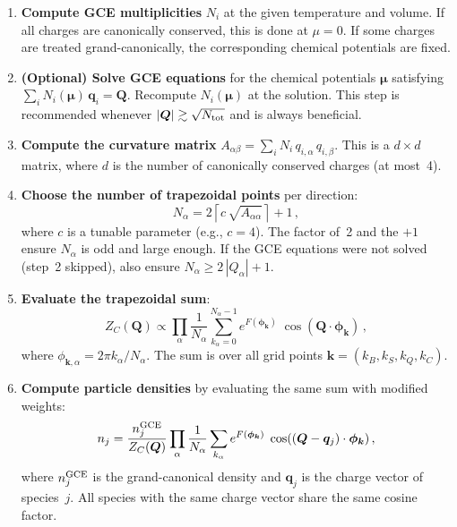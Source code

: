 \documentclass[11pt,a4paper]{article}
\newcommand{\bphi}{\bm{\phi}}
\newcommand{\bq}{\bm{q}}
\newcommand{\bQ}{\bm{Q}}
\begin{document}
\begin{enumerate}
  \item \textbf{Compute GCE multiplicities} $N_i$ at the given temperature and volume.
  If all charges are canonically conserved, this is done at $\mu = 0$.
  If some charges are treated grand-canonically, the corresponding chemical potentials are fixed.

  \item \textbf{(Optional) Solve GCE equations} for the chemical potentials $\bm{\mu}$ satisfying $\sum_i N_i(\bm{\mu})\,\bq_i = \bQ$.
  Recompute $N_i(\bm{\mu})$ at the solution.
  This step is recommended whenever $|\bQ| \gtrsim \sqrt{N_{\rm tot}}$ and is always beneficial.

  \item \textbf{Compute the curvature matrix} $A_{\alpha\beta} = \sum_i N_i\,q_{i,\alpha}\,q_{i,\beta}$.
  This is a $d \times d$ matrix, where $d$ is the number of canonically conserved charges (at most~4).

  \item \textbf{Choose the number of trapezoidal points} per direction:
  \begin{equation}
    N_\alpha = 2\left\lceil c\,\sqrt{A_{\alpha\alpha}} \right\rceil + 1\,,
  \end{equation}
  where $c$ is a tunable parameter (e.g., $c = 4$).
  The factor of~2 and the $+1$ ensure $N_\alpha$ is odd and large enough.
  If the GCE equations were not solved (step~2 skipped), also ensure $N_\alpha \geq 2\,|Q_\alpha| + 1$.

  \item \textbf{Evaluate the trapezoidal sum}:
  \begin{equation}\label{eq:trap-sum}
    Z_C(\bQ) \propto \prod_\alpha \frac{1}{N_\alpha} \sum_{k_\alpha = 0}^{N_\alpha - 1}
    e^{F(\bphi_{\bm{k}})}\;\cos(\bQ \cdot \bphi_{\bm{k}})\,,
  \end{equation}
  where $\phi_{\bm{k},\alpha} = 2\pi k_\alpha / N_\alpha$.
  The sum is over all grid points $\bm{k} = (k_B, k_S, k_Q, k_C)$.

  \item \textbf{Compute particle densities} by evaluating the same sum with modified weights:
  \begin{equation}
    n_j = \frac{n_j^{\rm GCE}}{Z_C(\bQ)} \prod_\alpha \frac{1}{N_\alpha} \sum_{k_\alpha}
    e^{F(\bphi_{\bm{k}})}\;\cos((\bQ - \bq_j) \cdot \bphi_{\bm{k}})\,,
  \end{equation}
  where $n_j^{\rm GCE}$ is the grand-canonical density and $\bq_j$ is the charge vector of species~$j$.
  All species with the same charge vector share the same cosine factor.
\end{enumerate}
\end{document}
